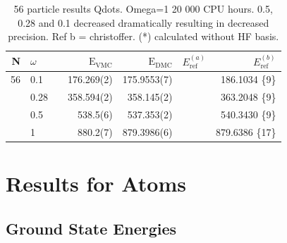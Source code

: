  \begin{table}
\begin{center}
\begin{tabular}{rlp{2cm}|rrrr}
    N     & $\omega$& & $\mathrm{E_{VMC}}$ & $\mathrm{E_{DMC}}$ & $E_\mathrm{ref}^{(a)}$& $E_\mathrm{ref}^{(b)}$ \\
\hline\hline
   56     & 0.1     & & 176.269(2) & 175.9553(7) & & 186.1034 \{9\} \\
          & 0.28    & & 358.594(2) & 358.145(2)  & & 363.2048 \{9\}  \\
          & 0.5     & & 538.5(6)   & 537.353(2)  & & 540.3430 \{9\}  \\
          & 1       & & 880.2(7)   & 879.3986(6) & & 879.6386 \{17\} \\
\hline\hline
\end{tabular}
\caption{56 particle results Qdots. Omega=1 20 000 CPU hours. 0.5, 0.28 and 0.1 decreased dramatically resulting in decreased precision. Ref b = christoffer. (*) calculated without HF basis.}
\end{center}
\end{table}
 
 
 \section{Results for Atoms}
 
 \subsection{Ground State Energies}
 
